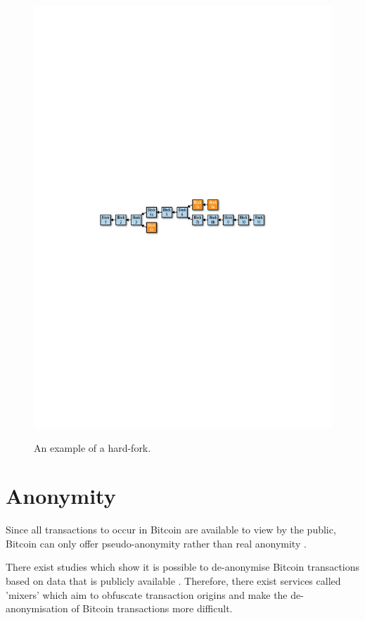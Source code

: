 \begin{figure}[h!]
  \centering
  \includegraphics[width = 15cm]{./figures/hard-fork}\\[0.5cm] 
  \caption{An example of a hard-fork. \cite{RefWorks:doc:5c39e80ae4b0854ae611b047}}
  \label{fig:hard-fork}
\end{figure}


\section{Anonymity}\label{background-anonymity}

Since all transactions to occur in Bitcoin are available to view by the public, Bitcoin can only offer pseudo-anonymity rather than real anonymity \cite{RefWorks:doc:5c3db7d6e4b0fa2b1fe68b48}.

There exist studies which show it is possible to de-anonymise Bitcoin transactions based on data that is publicly available \cite{RefWorks:doc:5c3db7d6e4b0fa2b1fe68b48}. Therefore, there exist services called 'mixers' which aim to obfuscate transaction origins and make the de-anonymisation of Bitcoin transactions more difficult. 

